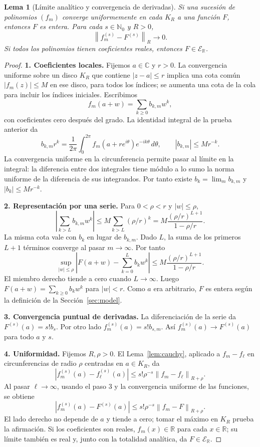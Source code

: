\documentclass[11pt,a4paper]{article}
\numberwithin{equation}{section}
\newtheorem{lemma}[theorem]{Lema}
\theoremstyle{definition}
\theoremstyle{remark}
\newcommand{\R}{\mathbb R}
\newcommand{\C}{\mathbb C}
\newcommand{\Nn}{\mathbb N_0}
\newcommand{\ER}{\mathcal E_{\R}}
\newcommand{\norm}[1]{\left\lVert#1\right\rVert}
\newcommand{\paso}[1]{\par\smallskip\noindent\textbf{#1}\quad}
\begin{document}
\begin{lemma}[Límite analítico y convergencia de derivadas]\label{lem:analyticlimit}
Si una sucesión de polinomios $(f_m)$ converge uniformemente en cada $K_R$ a una función $F$, entonces $F$ es entera. Para cada $s\in\Nn$ y $R>0$,
\[
\norm{f_m^{(s)}-F^{(s)}}_R\longrightarrow0.
\]
Si todos los polinomios tienen coeficientes reales, entonces $F\in\ER$.
\end{lemma}
\begin{proof}
\paso{1. Coeficientes locales.}
Fijemos $a\in\C$ y $r>0$. La convergencia uniforme sobre un disco $K_R$ que contiene $|z-a|\le r$ implica una cota común $|f_m(z)|\le M$ en ese disco, para todos los índices; se aumenta una cota de la cola para incluir los índices iniciales. Escribimos
\[
f_m(a+w)=\sum_{k\ge0}b_{k,m}w^k,
\]
con coeficientes cero después del grado. La identidad integral de la prueba anterior da
\[
b_{k,m}r^k=\frac1{2\pi}\int_0^{2\pi}f_m(a+re^{i\theta})e^{-ik\theta}\,d\theta,
\qquad |b_{k,m}|\le Mr^{-k}.
\]
La convergencia uniforme en la circunferencia permite pasar al límite en la integral: la diferencia entre dos integrales tiene módulo a lo sumo la norma uniforme de la diferencia de sus integrandos. Por tanto existe $b_k=\lim_m b_{k,m}$ y $|b_k|\le Mr^{-k}$.

\paso{2. Representación por una serie.}
Para $0<\rho<r$ y $|w|\le\rho$,
\[
\left|\sum_{k>L}b_{k,m}w^k\right|
\le M\sum_{k>L}(\rho/r)^k
=M\frac{(\rho/r)^{L+1}}{1-\rho/r}.
\]
La misma cota vale con $b_k$ en lugar de $b_{k,m}$. Dado $L$, la suma de los primeros $L+1$ términos converge al pasar $m\to\infty$. Por tanto
\[
\sup_{|w|\le\rho}\left|F(a+w)-\sum_{k=0}^Lb_kw^k\right|
\le M\frac{(\rho/r)^{L+1}}{1-\rho/r}.
\]
El miembro derecho tiende a cero cuando $L\to\infty$. Luego $F(a+w)=\sum_{k\ge0}b_kw^k$ para $|w|<r$. Como $a$ era arbitrario, $F$ es entera según la definición de la Sección~\ref{sec:model}.

\paso{3. Convergencia puntual de derivadas.}
La diferenciación de la serie da $F^{(s)}(a)=s!b_s$. Por otro lado $f_m^{(s)}(a)=s!b_{s,m}$. Así $f_m^{(s)}(a)\to F^{(s)}(a)$ para todo $a$ y $s$.

\paso{4. Uniformidad.}
Fijemos $R,\rho>0$. El Lema~\ref{lem:cauchy}, aplicado a $f_m-f_\ell$ en circunferencias de radio $\rho$ centradas en $a\in K_R$, da
\[
|f_m^{(s)}(a)-f_\ell^{(s)}(a)|\le s!\rho^{-s}\norm{f_m-f_\ell}_{R+\rho}.
\]
Al pasar $\ell\to\infty$, usando el paso 3 y la convergencia uniforme de las funciones, se obtiene
\[
|f_m^{(s)}(a)-F^{(s)}(a)|\le s!\rho^{-s}\norm{f_m-F}_{R+\rho}.
\]
El lado derecho no depende de $a$ y tiende a cero; tomar el máximo en $K_R$ prueba la afirmación. Si los coeficientes son reales, $f_m(x)\in\R$ para cada $x\in\R$; su límite también es real y, junto con la totalidad analítica, da $F\in\ER$.
\end{proof}
\end{document}
